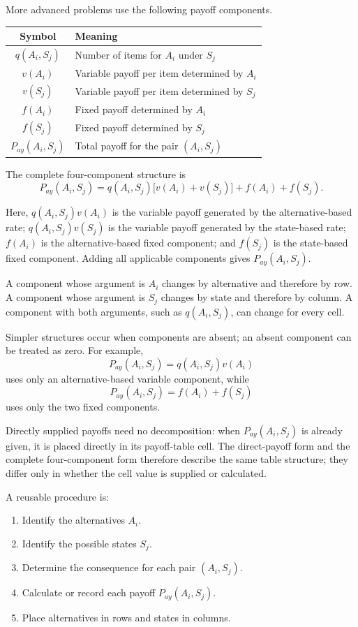 	More advanced problems use the following payoff components.
	\begin{center}
		\begin{tabular}{cl}
			\toprule
			Symbol & Meaning \\
			\midrule
			$q(A_i,S_j)$ & Number of items for $A_i$ under $S_j$ \\
			$v(A_i)$ & Variable payoff per item determined by $A_i$ \\
			$v(S_j)$ & Variable payoff per item determined by $S_j$ \\
			$f(A_i)$ & Fixed payoff determined by $A_i$ \\
			$f(S_j)$ & Fixed payoff determined by $S_j$ \\
			$P_{ay}(A_i,S_j)$ & Total payoff for the pair $(A_i,S_j)$ \\
			\bottomrule
		\end{tabular}
	\end{center}
	
	The complete four-component structure is
	\[
	P_{ay}(A_i,S_j)
	=
	q(A_i,S_j)\big[v(A_i)+v(S_j)\big]
	+f(A_i)+f(S_j).
	\]
	
	Here, $q(A_i,S_j)v(A_i)$ is the variable payoff generated by the alternative-based rate; $q(A_i,S_j)v(S_j)$ is the variable payoff generated by the state-based rate; $f(A_i)$ is the alternative-based fixed component; and $f(S_j)$ is the state-based fixed component. Adding all applicable components gives $P_{ay}(A_i,S_j)$.
	
	A component whose argument is $A_i$ changes by alternative and therefore by row. A component whose argument is $S_j$ changes by state and therefore by column. A component with both arguments, such as $q(A_i,S_j)$, can change for every cell.
	
	Simpler structures occur when components are absent; an absent component can be treated as zero. For example,
	\[
	P_{ay}(A_i,S_j)=q(A_i,S_j)v(A_i)
	\]
	uses only an alternative-based variable component, while
	\[
	P_{ay}(A_i,S_j)=f(A_i)+f(S_j)
	\]
	uses only the two fixed components.
	
	Directly supplied payoffs need no decomposition: when $P_{ay}(A_i,S_j)$ is already given, it is placed directly in its payoff-table cell. The direct-payoff form and the complete four-component form therefore describe the same table structure; they differ only in whether the cell value is supplied or calculated.
	
	A reusable procedure is:
	\begin{enumerate}[label=\arabic*.]
		\item Identify the alternatives $A_i$.
		\item Identify the possible states $S_j$.
		\item Determine the consequence for each pair $(A_i,S_j)$.
		\item Calculate or record each payoff $P_{ay}(A_i,S_j)$.
		\item Place alternatives in rows and states in columns.
	\end{enumerate}
	
